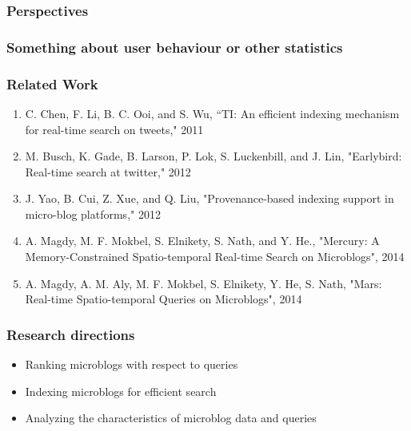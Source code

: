 \documentclass[11pt]{beamer}
\begin{document}
    
    \begin{frame}
		\frametitle{Perspectives}
        
	\end{frame}
	
    
    \begin{frame}
		\frametitle{Something about user behaviour or other statistics}
    \end{frame}
	
    
	\begin{frame}
		\frametitle{Related Work}
		\begin{enumerate}
			\item
				C. Chen, F. Li, B. C. Ooi, and S. Wu, “TI: An efficient indexing mechanism for real-time search on tweets," 2011
			\item
				M. Busch, K. Gade, B. Larson, P. Lok, S. Luckenbill, and J. Lin, "Earlybird: Real-time search at twitter," 2012
			\item
				 J. Yao, B. Cui, Z. Xue, and Q. Liu, "Provenance-based indexing support in micro-blog platforms," 2012
			\item
				A. Magdy, M. F. Mokbel, S. Elnikety, S. Nath, and Y. He., "Mercury: A Memory-Constrained Spatio-temporal Real-time Search on Microblogs", 2014
			\item
				A. Magdy, A. M. Aly, M. F. Mokbel, S. Elnikety, Y. He, S. Nath, "Mars: Real-time Spatio-temporal Queries on Microblogs", 2014
		\end{enumerate}
	\end{frame}
	
    
	
	\begin{frame}
		\frametitle{Research directions}
		\begin{itemize}
			\item
				Ranking microblogs with respect to queries
            \item
            	Indexing microblogs for efficient search
            \item
            	Analyzing the characteristics of microblog data and
queries
		\end{itemize}
	\end{frame}
	
\end{document}
